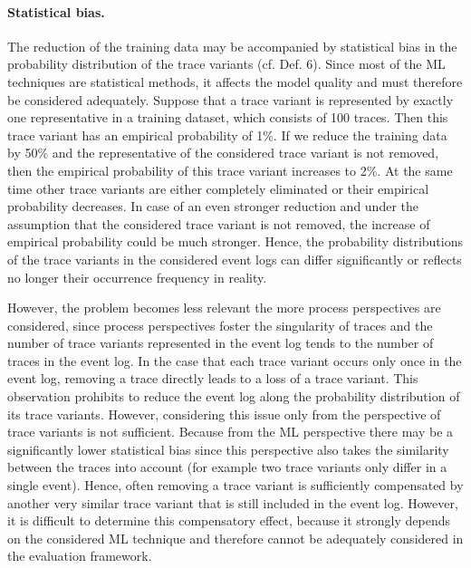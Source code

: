 \documentclass[runningheads]{llncs}
\begin{document}
\paragraph{Statistical bias.} 
\vspace{-8pt}
The reduction of the training data may be accompanied by statistical bias in the probability distribution of the trace variants (cf. Def. 6). Since most of the ML techniques are statistical methods, it affects the model quality and must therefore be considered adequately. 
Suppose that a trace variant is represented by exactly one representative in a training dataset, which consists of 100 traces. Then this trace variant has an empirical probability of 1\%. If we reduce the training data by 50\% and the representative of the considered trace variant is not removed, then the empirical probability of this trace variant increases to 2\%. At the same time other trace variants are either completely eliminated or their empirical probability decreases. In case of an even stronger reduction and under the assumption that the considered trace variant is not removed, the increase of empirical probability could be much stronger. Hence, the probability distributions of the trace variants in the considered event logs can differ significantly or reflects no longer their occurrence frequency in reality.   

However, the problem becomes less relevant the more process perspectives are considered, since process perspectives foster the singularity of traces and the number of trace variants represented in the event log tends to the number of traces in the event log. In the case that each trace variant occurs only once in the event log, removing a trace directly leads to a loss of a trace variant. This observation prohibits to reduce the event log along the probability distribution of its trace variants. However, considering this issue only from the perspective of trace variants is not sufficient. Because from the ML perspective there may be a significantly lower statistical bias since this perspective also takes the similarity between the traces into account (for example two trace variants only differ in a single event). Hence, often removing a trace variant is sufficiently compensated by another very similar trace variant that is still included in the event log. However, it is difficult to determine this compensatory effect, because it strongly depends on the considered ML technique and therefore cannot be adequately considered in the evaluation framework. 
\end{document}
